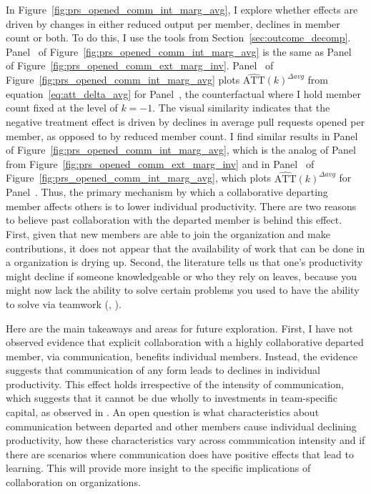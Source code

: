 \documentclass[12pt,notitlepage]{article}
\begin{document}
In Figure~\ref{fig:prs_opened_comm_int_marg_avg}, I explore whether effects are driven by changes in either reduced output per member, declines in member count or both. To do this, I use the tools from Section~\ref{sec:outcome_decomp}. Panel~ of Figure~\ref{fig:prs_opened_comm_int_marg_avg} is the same as Panel~ of Figure~\ref{fig:prs_opened_comm_ext_marg_inv}. Panel~ of Figure~\ref{fig:prs_opened_comm_int_marg_avg}  plots $\widehat{\mathrm{ATT}}(k)^{\Delta avg}$ from equation~\ref{eq:att_delta_avg} for Panel~, the counterfactual where I hold member count fixed at the level of $k=-1$. The visual similarity indicates that the negative treatment effect is driven by declines in average pull requests opened per member, as opposed to by reduced member count. I find similar results in Panel~ of  Figure~\ref{fig:prs_opened_comm_int_marg_avg}, which is the analog of Panel~ from Figure~\ref{fig:prs_opened_comm_ext_marg_inv} and in Panel~ of  Figure~\ref{fig:prs_opened_comm_int_marg_avg}, which plots $\widehat{\mathrm{ATT}}(k)^{\Delta avg}$ for Panel~. Thus, the primary mechanism by which a collaborative departing member affects others is to lower individual productivity. There are two reasons to believe past collaboration with the departed member is behind this effect. First, given that new members are able to join the organization and make contributions, it does not appear that the availability of work that can be done in a organization is drying up. Second, the literature tells us that one's productivity might decline if someone knowledgeable or who they rely on leaves, because you might now lack the ability to solve certain problems you used to have the ability to solve via teamwork (\cite{rigby_quantifying_2016}, \cite{jaravel_team-specific_2018}). 

Here are the main takeaways and areas for future exploration. First, I have not observed evidence that explicit collaboration with a highly collaborative departed member, via communication, benefits individual members. Instead, the evidence suggests that communication of any form leads to declines in individual productivity. This effect holds irrespective of the intensity of communication, which suggests that it cannot be due wholly to investments in team-specific capital, as observed in \cite{jaravel_team-specific_2018}. An open question is what characteristics about communication between departed and other members cause individual declining productivity, how these characteristics vary across communication intensity and if there are scenarios where communication does have positive effects that lead to learning. This will provide more insight to the specific implications of collaboration on organizations. 
\end{document}
